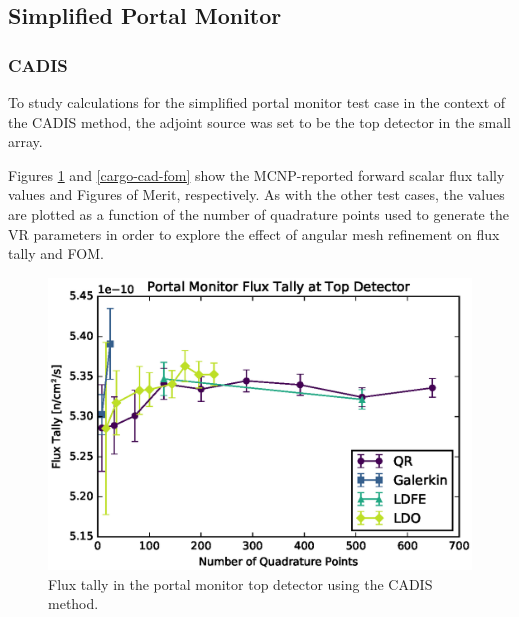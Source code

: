 \documentclass{article} %
\begin{document}
\subsection{Simplified Portal Monitor}

\subsubsection{CADIS}

To study calculations for the simplified portal monitor test case in the
context of the CADIS method, the adjoint source was set to be the top detector
in the small array.

Figures \ref{cargo-cad-tally} and \ref{cargo-cad-fom} show the MCNP-reported
forward scalar flux tally values and Figures of Merit, respectively. As with
the other test cases, the values are plotted as a function of the number of
quadrature points used to generate the VR parameters in order to explore
the effect of angular mesh refinement on flux tally and FOM.

\begin{figure}[!htb]
\centering
\includegraphics[max height=0.445\textheight]{portal-cadis-tally.eps}
\caption{Flux tally in the portal monitor top detector using the CADIS method.}
\label{cargo-cad-tally}
\end{figure}
\end{document}
